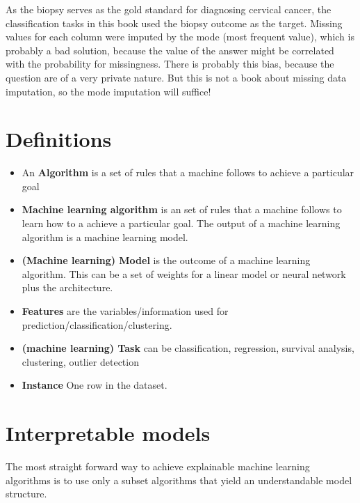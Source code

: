 \documentclass[12pt,]{krantz}
\providecommand{\tightlist}{%
  \setlength{\itemsep}{0pt}\setlength{\parskip}{0pt}}
\theoremstyle{definition}
\theoremstyle{definition}
\theoremstyle{definition}
\theoremstyle{remark}
\begin{document}
As the biopsy serves as the gold standard for diagnosing cervical
cancer, the classification tasks in this book used the biopsy outcome as
the target. Missing values for each column were imputed by the mode
(most frequent value), which is probably a bad solution, because the
value of the answer might be correlated with the probability for
missingness. There is probably this bias, because the question are of a
very private nature. But this is not a book about missing data
imputation, so the mode imputation will suffice!

\hypertarget{htmlwidget-0b23377a32b802608300}{}

\citep{fernandes2017transfer}

\chapter{Definitions}\label{defintions}

\begin{itemize}
\tightlist
\item
  An \textbf{Algorithm} is a set of rules that a machine follows to
  achieve a particular goal \citep{algorithm}
\item
  \textbf{Machine learning algorithm} is an set of rules that a machine
  follows to learn how to a achieve a particular goal. The output of a
  machine learning algorithm is a machine learning model.
\item
  \textbf{(Machine learning) Model} is the outcome of a machine learning
  algorithm. This can be a set of weights for a linear model or neural
  network plus the architecture.
\item
  \textbf{Features} are the variables/information used for
  prediction/classification/clustering.
\item
  \textbf{(machine learning) Task} can be classification, regression,
  survival analysis, clustering, outlier detection
\item
  \textbf{Instance} One row in the dataset.
\end{itemize}

\chapter{Interpretable models}\label{simple}

The most straight forward way to achieve explainable machine learning
algorithms is to use only a subset algorithms that yield an
understandable model structure.
\end{document}
